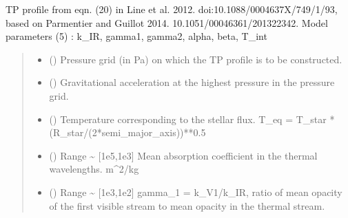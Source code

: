 \documentclass[letterpaper,10pt,english]{sphinxmanual}
\begin{document}
\begin{fulllineitems}
\label{\detokenize{api:nemesispy.TP_Guillot14}}
\pysigstartsignatures
{}
\pysigstopsignatures
\sphinxAtStartPar
TP profile from eqn. (20) in Line et al. 2012.
doi:10.1088/0004\sphinxhyphen{}637X/749/1/93, based on Parmentier and Guillot 2014.
10.1051/0004\sphinxhyphen{}6361/201322342.
Model parameters (5) : k\_IR, gamma1, gamma2, alpha, beta, T\_int
\begin{quote}\begin{description}
\begin{itemize}
\item {} 
\sphinxAtStartPar
{} () \textendash{} Pressure grid (in Pa) on which the TP profile is to be constructed.

\item {} 
\sphinxAtStartPar
{} () \textendash{} Gravitational acceleration at the highest pressure in the pressure
grid.

\item {} 
\sphinxAtStartPar
{} () \textendash{} Temperature corresponding to the stellar flux.
T\_eq = T\_star * (R\_star/(2*semi\_major\_axis))**0.5

\item {} 
\sphinxAtStartPar
{} () \textendash{} Range \textasciitilde{} {[}1e\sphinxhyphen{}5,1e3{]}
Mean absorption coefficient in the thermal wavelengths.
m\textasciicircum{}2/kg

\item {} 
\sphinxAtStartPar
{} () \textendash{} Range \textasciitilde{} {[}1e\sphinxhyphen{}3,1e2{]}
gamma\_1 = k\_V1/k\_IR, ratio of mean opacity of the first visible stream
to mean opacity in the thermal stream.


\end{itemize}
\end{description}
\end{quote}
\end{fulllineitems}
\end{document}
